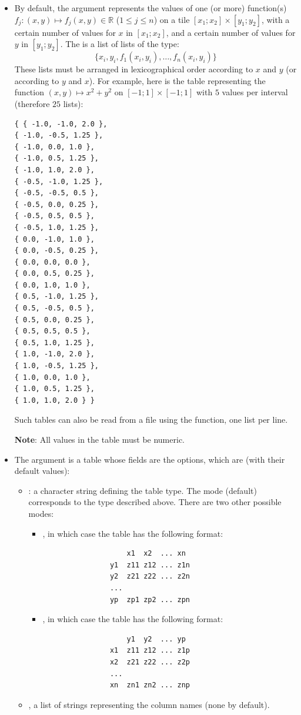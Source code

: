 \begin{itemize}
    \item By default, the argument  represents the values ​​of one (or more) function(s) $f_j\colon (x,y) \mapsto f_j(x,y)\in\mathbb R$ ($1\leqslant j \leqslant n$) on a tile $[x_1;x_2]\times [y_1;y_2]$, with a certain number of values ​​for $x$ in $[x_1;x_2]$, and a certain number of values ​​for $y$ in $[y_1;y_2]$. The  is a list of lists of the type:\[\{x_i,y_i,f_1(x_i,y_i),\ldots,f_n(x_i,y_i)\}\]
These lists must be arranged in lexicographical order according to $x$ and $y$ (or according to $y$ and $x$). For example, here is the table representing the function $(x,y)\mapsto x^2+y^2$ on $[-1;1]\times[-1;1]$ with $5$ values ​​per interval (therefore $25$ lists):

\begin{verbatim}
{ { -1.0, -1.0, 2.0 },
{ -1.0, -0.5, 1.25 },
{ -1.0, 0.0, 1.0 },
{ -1.0, 0.5, 1.25 },
{ -1.0, 1.0, 2.0 },
{ -0.5, -1.0, 1.25 },
{ -0.5, -0.5, 0.5 },
{ -0.5, 0.0, 0.25 },
{ -0.5, 0.5, 0.5 },
{ -0.5, 1.0, 1.25 },
{ 0.0, -1.0, 1.0 },
{ 0.0, -0.5, 0.25 },
{ 0.0, 0.0, 0.0 },
{ 0.0, 0.5, 0.25 },
{ 0.0, 1.0, 1.0 },
{ 0.5, -1.0, 1.25 },
{ 0.5, -0.5, 0.5 },
{ 0.5, 0.0, 0.25 },
{ 0.5, 0.5, 0.5 },
{ 0.5, 1.0, 1.25 },
{ 1.0, -1.0, 2.0 },
{ 1.0, -0.5, 1.25 },
{ 1.0, 0.0, 1.0 },
{ 1.0, 0.5, 1.25 },
{ 1.0, 1.0, 2.0 } }
\end{verbatim}

Such tables can also be read from a file using the  function, one list per line.

\textbf{Note}: All values ​​in the table must be numeric.

    \item The argument  is a table whose fields are the options, which are (with their default values):
    \begin{itemize}
    \item {} : a character string defining the table type. The  mode (default) corresponds to the type described above. There are two other possible modes:
        \begin{itemize}
        \item {}, in which case the table has the following format:
                \begin{verbatim}
                    x1  x2  ... xn
                y1  z11 z12 ... z1n
                y2  z21 z22 ... z2n
                ...
                yp  zp1 zp2 ... zpn
                \end{verbatim}
        \item {}, in which case the table has the following format:
                \begin{verbatim}
                    y1  y2  ... yp
                x1  z11 z12 ... z1p
                x2  z21 z22 ... z2p
                ...
                xn  zn1 zn2 ... znp
                \end{verbatim}
        \end{itemize}
            \item {}, a list of strings representing the column names (none by default).


\end{itemize}
\end{itemize}
